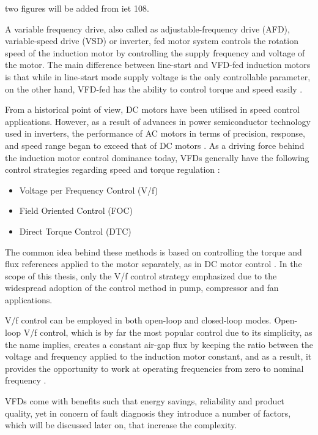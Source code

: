 two figures will be added from iet 108.

A variable frequency drive, also called as adjustable-frequency drive (AFD), variable-speed drive (VSD) or inverter, fed motor system controls the rotation speed of the induction motor by controlling the supply frequency and voltage of the motor. The main difference between line-start and VFD-fed induction motors is that while in line-start mode supply voltage is the only controllable parameter, on the other hand, VFD-fed has the ability to control torque and speed easily \cite{faiz2017fault}.

From a historical point of view, DC motors have been utilised in speed control applications. However, as a result of advances in power semiconductor technology used in inverters, the performance of AC motors in terms of precision, response, and speed range began to exceed that of DC motors \cite{doe2008improving,mikami2011historical}. As a driving force behind the induction motor control dominance today, VFDs generally have the following control strategies regarding speed and torque regulation \cite{weg,danfoss}:

\begin{itemize}
	\item Voltage per Frequency Control (V/f)
	\item Field Oriented Control (FOC)
	\item Direct Torque Control (DTC)
\end{itemize}

The common idea behind these methods is based on controlling the torque and flux references applied to the motor separately, as in DC motor control \cite{faiz2017fault}. In the scope of this thesis, only the V/f control strategy emphasized due to the widespread adoption of the control method in pump, compressor and fan applications. 

V/f control can be employed in both open-loop and closed-loop modes. Open-loop V/f control, which is by far the most popular control due to its simplicity, as the name implies, creates a constant air-gap flux by keeping the ratio between the voltage and frequency applied to the induction motor constant, and as a result, it provides the opportunity to work at operating frequencies from zero to nominal frequency \cite{bose2002modern}. 

VFDs come with benefits such that energy savings, reliability and product quality, yet in concern of fault diagnosis they introduce a number of factors, which will be discussed later on, that increase the complexity. 


